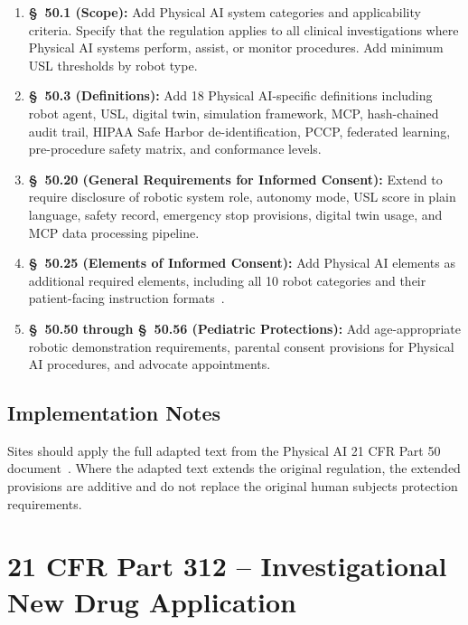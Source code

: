 \documentclass[11pt,letterpaper]{article}
\begin{document}
\begin{enumerate}[label=(\alph*)]
\item \textbf{\S~50.1 (Scope):} Add Physical AI system categories and
  applicability criteria. Specify that the regulation applies to all clinical
  investigations where Physical AI systems perform, assist, or monitor
  procedures. Add minimum USL thresholds by robot type.

\item \textbf{\S~50.3 (Definitions):} Add 18 Physical AI-specific definitions
  including robot agent, USL, digital twin, simulation framework, MCP,
  hash-chained audit trail, HIPAA Safe Harbor de-identification, PCCP,
  federated learning, pre-procedure safety matrix, and conformance levels.

\item \textbf{\S~50.20 (General Requirements for Informed Consent):} Extend
  to require disclosure of robotic system role, autonomy mode, USL score in
  plain language, safety record, emergency stop provisions, digital twin usage,
  and MCP data processing pipeline.

\item \textbf{\S~50.25 (Elements of Informed Consent):} Add Physical AI
  elements as additional required elements, including all 10 robot categories
  and their patient-facing instruction formats~\cite{patientinstructions2026}.

\item \textbf{\S~50.50 through \S~50.56 (Pediatric Protections):} Add
  age-appropriate robotic demonstration requirements, parental consent
  provisions for Physical AI procedures, and advocate appointments.
\end{enumerate}

\subsection{Implementation Notes}

Sites should apply the full adapted text from the Physical AI 21 CFR Part 50
document~\cite{cfr50adapt}. Where the adapted text extends the original
regulation, the extended provisions are additive and do not replace the
original human subjects protection requirements.

\section{21 CFR Part 312 -- Investigational New Drug Application}
\end{document}
